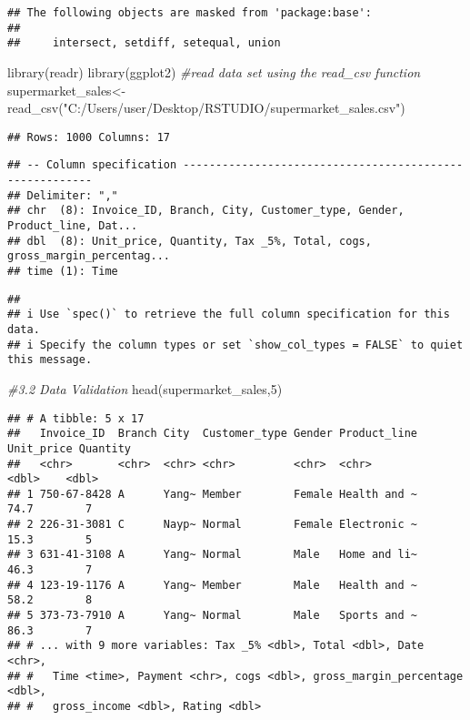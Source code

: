 \documentclass[
]{article}
\newenvironment{Shaded}{\begin{snugshade}}{\end{snugshade}}
\newcommand{\CommentTok}[1]{\textcolor[rgb]{0.56,0.35,0.01}{\textit{#1}}}
\newcommand{\DecValTok}[1]{\textcolor[rgb]{0.00,0.00,0.81}{#1}}
\newcommand{\FunctionTok}[1]{\textcolor[rgb]{0.00,0.00,0.00}{#1}}
\newcommand{\NormalTok}[1]{#1}
\newcommand{\OtherTok}[1]{\textcolor[rgb]{0.56,0.35,0.01}{#1}}
\newcommand{\StringTok}[1]{\textcolor[rgb]{0.31,0.60,0.02}{#1}}
\begin{document}
\begin{verbatim}
## The following objects are masked from 'package:base':
## 
##     intersect, setdiff, setequal, union
\end{verbatim}

\begin{Shaded}
\begin{Highlighting}[]
\FunctionTok{library}\NormalTok{(readr)}
\FunctionTok{library}\NormalTok{(ggplot2)}
\CommentTok{\#read data set using the read\_csv function}
\NormalTok{supermarket\_sales}\OtherTok{\textless{}{-}}\FunctionTok{read\_csv}\NormalTok{(}\StringTok{"C:/Users/user/Desktop/RSTUDIO/supermarket\_sales.csv"}\NormalTok{)}
\end{Highlighting}
\end{Shaded}

\begin{verbatim}
## Rows: 1000 Columns: 17
\end{verbatim}

\begin{verbatim}
## -- Column specification --------------------------------------------------------
## Delimiter: ","
## chr  (8): Invoice_ID, Branch, City, Customer_type, Gender, Product_line, Dat...
## dbl  (8): Unit_price, Quantity, Tax _5%, Total, cogs, gross_margin_percentag...
## time (1): Time
\end{verbatim}

\begin{verbatim}
## 
## i Use `spec()` to retrieve the full column specification for this data.
## i Specify the column types or set `show_col_types = FALSE` to quiet this message.
\end{verbatim}

\begin{Shaded}
\begin{Highlighting}[]
\CommentTok{\#3.2 Data Validation}
\FunctionTok{head}\NormalTok{(supermarket\_sales,}\DecValTok{5}\NormalTok{)}
\end{Highlighting}
\end{Shaded}

\begin{verbatim}
## # A tibble: 5 x 17
##   Invoice_ID  Branch City  Customer_type Gender Product_line Unit_price Quantity
##   <chr>       <chr>  <chr> <chr>         <chr>  <chr>             <dbl>    <dbl>
## 1 750-67-8428 A      Yang~ Member        Female Health and ~       74.7        7
## 2 226-31-3081 C      Nayp~ Normal        Female Electronic ~       15.3        5
## 3 631-41-3108 A      Yang~ Normal        Male   Home and li~       46.3        7
## 4 123-19-1176 A      Yang~ Member        Male   Health and ~       58.2        8
## 5 373-73-7910 A      Yang~ Normal        Male   Sports and ~       86.3        7
## # ... with 9 more variables: Tax _5% <dbl>, Total <dbl>, Date <chr>,
## #   Time <time>, Payment <chr>, cogs <dbl>, gross_margin_percentage <dbl>,
## #   gross_income <dbl>, Rating <dbl>
\end{verbatim}
\end{document}
